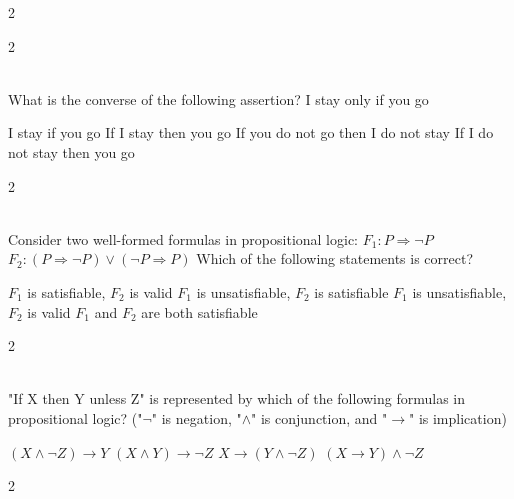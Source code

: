\documentclass[12pt]{exam}
\begin{document}
\begin{questions}
\begin{multicols*}{2}
\end{multicols*}
\vspace{0.6cm}
\newpage
\begin{multicols*}{2}

 \\[0.2cm]
{\Large What is the converse of the following assertion? I stay only if you go}
\begin{choices}
  \choice I stay if you go
  \choice If I stay then you go
  \choice If you do not go then I do not stay
  \choice If I do not stay then you go
\end{choices}

\end{multicols*}
\vspace{0.6cm}
\newpage
\begin{multicols*}{2}

 \\[0.2cm]
{\Large Consider two well-formed formulas in propositional logic: $F_1 : P \Rightarrow \neg P$ $F_2 : (P \Rightarrow \neg P) \vee (\neg P \Rightarrow P)$ Which of the following statements is correct?}
\begin{choices}
  \choice $F_1$ is satisfiable, $F_2$ is valid
  \choice $F_1$ is unsatisfiable, $F_2$ is satisfiable
  \choice $F_1$ is unsatisfiable, $F_2$ is valid
  \choice $F_1$ and $F_2$ are both satisfiable
\end{choices}

\end{multicols*}
\vspace{0.6cm}
\newpage
\begin{multicols*}{2}

 \\[0.2cm]
{\Large "If X then Y unless Z" is represented by which of the following formulas in propositional logic? ("$\neg$" is negation, "$\wedge$" is conjunction, and "$\rightarrow$" is implication)}
\begin{choices}
  \choice $(X \wedge \neg Z) \rightarrow Y$
  \choice $(X \wedge Y) \rightarrow \neg Z$
  \choice $X \rightarrow (Y \wedge \neg Z)$
  \choice $(X \rightarrow Y) \wedge \neg Z$
\end{choices}

\end{multicols*}
\vspace{0.6cm}
\newpage
\begin{multicols*}{2}


\end{multicols*}
\end{questions}
\end{document}
